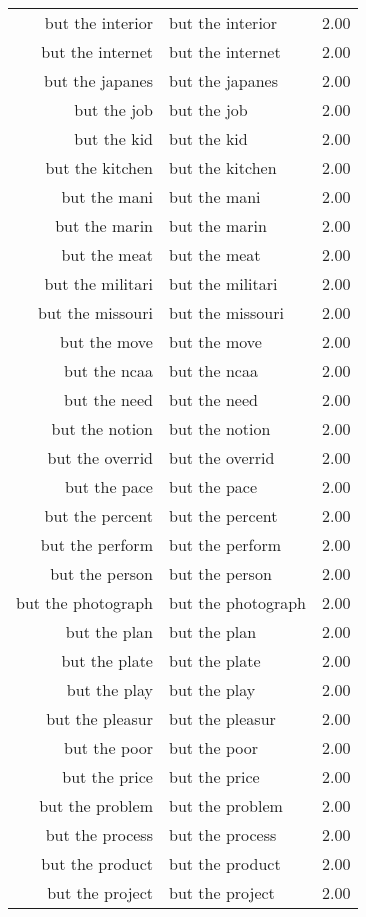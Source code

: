 \begin{table}[ht]
\begin{tabular}{rlr}
  but the interior & but the interior & 2.00 \\ 
  but the internet & but the internet & 2.00 \\ 
  but the japanes & but the japanes & 2.00 \\ 
  but the job & but the job & 2.00 \\ 
  but the kid & but the kid & 2.00 \\ 
  but the kitchen & but the kitchen & 2.00 \\ 
  but the mani & but the mani & 2.00 \\ 
  but the marin & but the marin & 2.00 \\ 
  but the meat & but the meat & 2.00 \\ 
  but the militari & but the militari & 2.00 \\ 
  but the missouri & but the missouri & 2.00 \\ 
  but the move & but the move & 2.00 \\ 
  but the ncaa & but the ncaa & 2.00 \\ 
  but the need & but the need & 2.00 \\ 
  but the notion & but the notion & 2.00 \\ 
  but the overrid & but the overrid & 2.00 \\ 
  but the pace & but the pace & 2.00 \\ 
  but the percent & but the percent & 2.00 \\ 
  but the perform & but the perform & 2.00 \\ 
  but the person & but the person & 2.00 \\ 
  but the photograph & but the photograph & 2.00 \\ 
  but the plan & but the plan & 2.00 \\ 
  but the plate & but the plate & 2.00 \\ 
  but the play & but the play & 2.00 \\ 
  but the pleasur & but the pleasur & 2.00 \\ 
  but the poor & but the poor & 2.00 \\ 
  but the price & but the price & 2.00 \\ 
  but the problem & but the problem & 2.00 \\ 
  but the process & but the process & 2.00 \\ 
  but the product & but the product & 2.00 \\ 
  but the project & but the project & 2.00 \\ 

\end{tabular}
\end{table}
